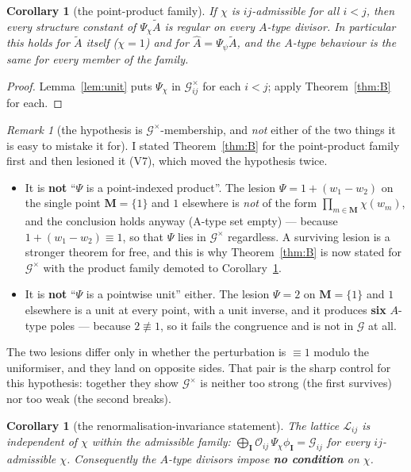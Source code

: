 \documentclass[11pt]{article}
\theoremstyle{plain}
\newtheorem{cor}[thm]{Corollary}
\theoremstyle{definition}
\theoremstyle{remark}
\newtheorem{rem}[thm]{Remark}
\theoremstyle{plain}
\newcommand{\bI}{\mathbf{I}}
\newcommand{\bM}{\mathbf{M}}
\newcommand{\At}{\widetilde{A}}
\newcommand{\Ah}{\widehat{A}}
\newcommand{\Lat}{\mathcal{L}}
\newcommand{\Gkm}{\mathcal{G}}
\begin{document}
\begin{cor}[the point-product family]\label{cor:family}
If $\chi$ is $ij$-admissible for all $i<j$, then every structure constant of
$\Psi_\chi\At$ is regular on every $A$-type divisor.  In particular this holds
for $\At$ itself ($\chi=1$) and for $\Ah=\Psi_\psi\At$, and the $A$-type
behaviour is the same for every member of the family.
\end{cor}

\begin{proof}
Lemma~\ref{lem:unit} puts $\Psi_\chi$ in $\Gkm_{ij}^{\times}$ for each $i<j$;
apply Theorem~\ref{thm:B} for each.
\end{proof}

\begin{rem}[the hypothesis is $\Gkm^{\times}$-membership, and \emph{not} either of
the two things it is easy to mistake it for]\label{rem:hyp}
I stated Theorem~\ref{thm:B} for the point-product family first and then
lesioned it (V7), which moved the hypothesis twice.
\begin{itemize}
\item It is \textbf{not} ``$\Psi$ is a point-indexed product''.  The lesion
  $\Psi=1+(w_1-w_2)$ on the single point $\bM=\{1\}$ and $1$ elsewhere is
  \emph{not} of the form $\prod_{m\in\bM}\chi(w_m)$, and the conclusion holds
  anyway (A-type set empty) --- because $1+(w_1-w_2)\equiv1$, so that $\Psi$ lies
  in $\Gkm^{\times}$ regardless.  A surviving lesion is a stronger theorem for
  free, and this is why Theorem~\ref{thm:B} is now stated for $\Gkm^{\times}$
  with the product family demoted to Corollary~\ref{cor:family}.
\item It is \textbf{not} ``$\Psi$ is a pointwise unit'' either.  The lesion
  $\Psi=2$ on $\bM=\{1\}$ and $1$ elsewhere is a unit at every point, with a
  unit inverse, and it produces \textbf{six} $A$-type poles --- because
  $2\not\equiv1$, so it fails the congruence and is not in $\Gkm$ at all.
\end{itemize}
The two lesions differ only in whether the perturbation is $\equiv1$ modulo the
uniformiser, and they land on opposite sides.  That pair is the sharp control for
this hypothesis: together they show $\Gkm^{\times}$ is neither too strong (the
first survives) nor too weak (the second breaks).
\end{rem}

\begin{cor}[the renormalisation-invariance statement]\label{cor:inv}
The lattice $\Lat_{ij}$ is independent of $\chi$ within the admissible family:
$\bigoplus_\bI\mathcal{O}_{ij}\,\Psi_\chi\phi_\bI=\Gkm_{ij}$ for every
$ij$-admissible $\chi$.  Consequently the $A$-type divisors impose
\textbf{no condition} on $\chi$.
\end{cor}
\end{document}
